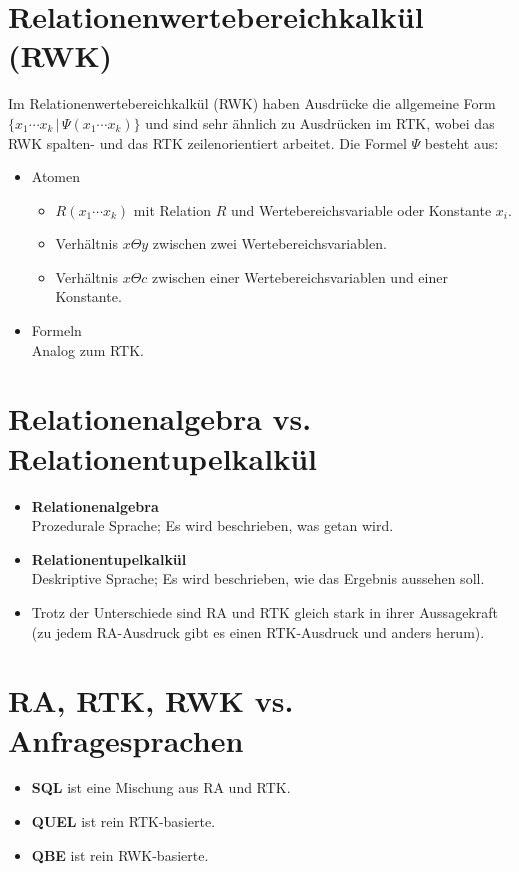 \documentclass[a4paper, 11pt, accentcolor = tud3b]{tudreport}
\providecommand{\forwhich}{\ensuremath{{\,\vert\,}}}
\begin{document}
        \section{Relationenwertebereichkalkül (RWK)} %
            Im Relationenwertebereichkalkül (RWK) haben Ausdrücke die allgemeine Form \( \{ x_1 \cdots x_k \forwhich \Psi(x_1 \cdots x_k) \} \) und sind sehr ähnlich zu Ausdrücken im RTK, wobei das RWK spalten- und das RTK zeilenorientiert arbeitet. Die Formel \(\Psi\) besteht aus:
            \begin{itemize}
            	\item Atomen
            		\begin{itemize}
            			\item \(R(x_1 \cdots x_k)\) mit Relation \(R\) und Wertebereichsvariable oder Konstante \(x_i\).
            			\item Verhältnis \( x \Theta y \) zwischen zwei Wertebereichsvariablen.
            			\item Verhältnis \( x \Theta c \) zwischen einer Wertebereichsvariablen und einer Konstante.
            		\end{itemize}
            	\item Formeln \\ Analog zum RTK.
            \end{itemize}

        \section{Relationenalgebra vs. Relationentupelkalkül} %
            \begin{itemize}
            	\item \textbf{Relationenalgebra} \\ Prozedurale Sprache; Es wird beschrieben, was getan wird.
            	\item \textbf{Relationentupelkalkül} \\ Deskriptive Sprache; Es wird beschrieben, wie das Ergebnis aussehen soll.
            	\item Trotz der Unterschiede sind RA und RTK gleich stark in ihrer Aussagekraft (zu jedem RA-Ausdruck gibt es einen RTK-Ausdruck und anders herum).
            \end{itemize}

        \section{RA, RTK, RWK vs. Anfragesprachen} %
        	\begin{itemize}
        		\item \textbf{SQL} ist eine Mischung aus RA und RTK.
        		\item \textbf{QUEL} ist rein RTK-basierte.
        		\item \textbf{QBE} ist rein RWK-basierte.
        	\end{itemize}
\end{document}
